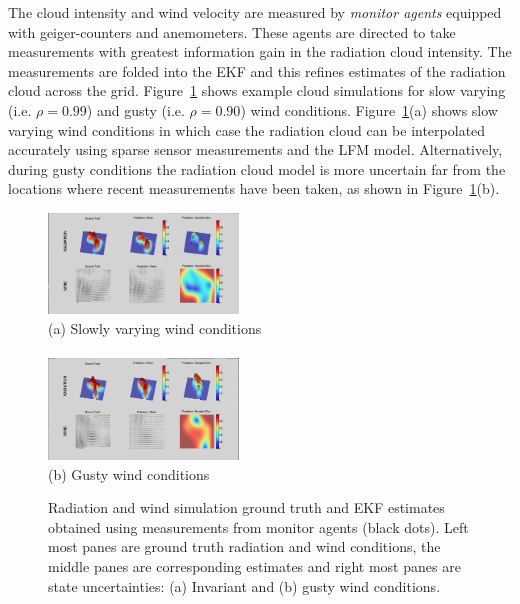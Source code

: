 The cloud intensity and wind velocity are measured by {\it monitor agents} equipped with geiger-counters and anemometers.  These agents are directed to take measurements with greatest information gain in the radiation cloud intensity.  The measurements are folded into the EKF and this refines estimates of the radiation cloud across the grid.  Figure~\ref{radiation_screen_shots} shows example cloud simulations for slow varying (i.e. $\rho=0.99$) and gusty (i.e. $\rho=0.90$) wind conditions.  Figure~\ref{radiation_screen_shots}(a) shows slow varying wind conditions in which case the radiation cloud can be interpolated accurately using sparse sensor measurements and the LFM model.  Alternatively, during gusty conditions the radiation cloud model is more uncertain far from the locations where recent measurements have been taken, as shown in Figure~\ref{radiation_screen_shots}(b).

\begin{figure}[ht] \begin{center}
    \includegraphics[width=0.45\textwidth]{figures/radiation_ss_calm.png}\\
    (a) Slowly varying wind conditions\\ \ \\
    \includegraphics[width=0.45\textwidth]{figures/radiation_ss_gust.png}\\
    (b) Gusty wind conditions 
\caption{\label{radiation_screen_shots} Radiation and wind simulation ground truth and EKF estimates obtained using measurements from monitor agents (black dots).  Left most panes are ground truth radiation and wind conditions, the middle panes are corresponding estimates and right most panes are state uncertainties:  (a) Invariant and (b) gusty wind conditions.}
\end{center}
\end{figure}
